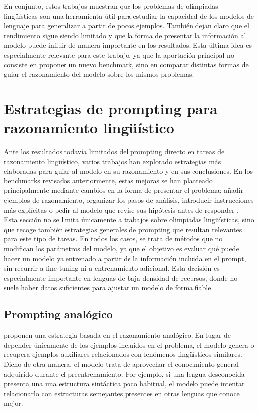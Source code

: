 En conjunto, estos trabajos muestran que los problemas de olimpiadas lingüísticas son una herramienta útil para estudiar la capacidad de los modelos de lenguaje para generalizar a partir de pocos ejemplos. También dejan claro que el rendimiento sigue siendo limitado y que la forma de presentar la información al modelo puede influir de manera importante en los resultados. Esta última idea es especialmente relevante para este trabajo, ya que la aportación principal no consiste en proponer un nuevo benchmark, sino en comparar distintas formas de guiar el razonamiento del modelo sobre los mismos problemas.

\section{Estrategias de prompting para razonamiento lingüístico}
\label{sec:prompting}

Ante los resultados todavía limitados del prompting directo en tareas de razonamiento lingüístico, varios trabajos han explorado estrategias más elaboradas para guiar al modelo en su razonamiento y en sus conclusiones. En los benchmarks revisados anteriormente, estas mejoras se han planteado principalmente mediante cambios en la forma de presentar el problema: añadir ejemplos de razonamiento, organizar los pasos de análisis, introducir instrucciones más explícitas o pedir al modelo que revise sus hipótesis antes de responder \citep{chi2024modeling,zhu2025evaluating,madaan2023selfrefine}. Esta sección no se limita únicamente a trabajos sobre olimpiadas lingüísticas, sino que recoge también estrategias generales de prompting que resultan relevantes para este tipo de tareas. En todos los casos, se trata de métodos que no modifican los parámetros del modelo, ya que el objetivo es evaluar qué puede hacer un modelo ya entrenado a partir de la información incluida en el prompt, sin recurrir a fine-tuning ni a entrenamiento adicional. Esta decisión es especialmente importante en lenguas de baja densidad de recursos, donde no suele haber datos suficientes para ajustar un modelo de forma fiable.

\subsection{Prompting analógico}

\citet{ramji2024inductive} proponen una estrategia basada en el razonamiento analógico. En lugar de depender únicamente de los ejemplos incluidos en el problema, el modelo genera o recupera ejemplos auxiliares relacionados con fenómenos lingüísticos similares. Dicho de otra manera, el modelo trata de aprovechar el conocimiento general adquirido durante el preentrenamiento. Por ejemplo, si una lengua desconocida presenta una una estructura sintáctica poco habitual, el modelo puede intentar relacionarlo con estructuras semejantes presentes en otras lenguas que conoce mejor.

